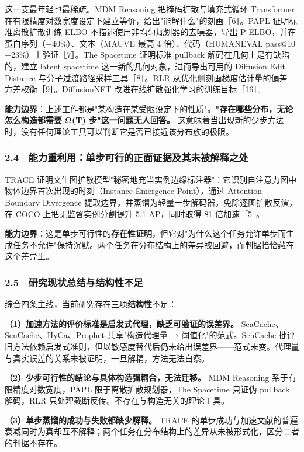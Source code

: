 \documentclass[12pt,a4paper]{ctexart}
\begin{document}
这一支最年轻也最稀疏。MDM Reasoning 把掩码扩散与填充式循环 Transformer 在有限精度对数宽度设定下建立等价，给出"能解什么"的刻画［6］。PAPL 证明标准离散扩散训练 ELBO 不描述使用非均匀规划器的去噪器，导出 P-ELBO，并在蛋白序列（+40\%）、文本（MAUVE 最高 4 倍）、代码（HUMANEVAL pass@10 +23\%）上验证［7］。The Spacetime 证明标准 pullback 解码在几何上是有缺陷的，建立 latent spacetime 这一新的几何对象，进而导出可用的 Diffusion Edit Distance 与分子过渡路径采样工具［8］。RLR 从优化侧刻画梯度估计量的偏差—方差权衡［9］。DiffusionNFT 改进在线扩散强化学习的训练目标［16］。

\textbf{能力边界}：上述工作都是"某构造在某受限设定下的性质"。\textbf{"存在哪些分布，无论怎么构造都需要 Ω(T) 步"这一问题无人回答。} 这意味着当出现新的少步方法时，没有任何理论工具可以判断它是否已接近该分布族的极限。

\subsubsection*{2.4　能力重利用：单步可行的正面证据及其未被解释之处}

TRACE 证明文生图扩散模型"秘密地充当实例边缘标注器"：它识别自注意力图中物体边界首次出现的时刻（Instance Emergence Point），通过 Attention Boundary Divergence 提取边界，并蒸馏为轻量一步解码器，免除逐图扩散反演，在 COCO 上把无监督实例分割提升 5.1 AP，同时取得 81 倍加速［5］。

\textbf{能力边界}：这是单步可行性的\textbf{存在性证明}，但它对"为什么这个任务允许单步而生成任务不允许"保持沉默。两个任务在分布结构上的差异被回避，而判据恰恰藏在这个差异里。

\subsubsection*{2.5　研究现状总结与结构性不足}

综合四条主线，当前研究存在三项\textbf{结构性}不足：

\textbf{（1）加速方法的评价标准是启发式代理，缺乏可验证的误差界。} SeaCache、SenCache、HyCa、Prophet 共享"构造代理量 → 阈值化"的范式。SenCache 批评旧方法依赖启发式准则，但以敏感度替代后仍未给出误差界——范式未变。代理量与真实误差的关系未被证明，一旦解耦，方法无法自察。

\textbf{（2）少步可行性的结论与具体构造强耦合，无法迁移。} MDM Reasoning 系于有限精度对数宽度，PAPL 限于离散扩散规划器，The Spacetime 只证伪 pullback 解码，RLR 只处理截断反传。不存在与构造无关的理论工具。

\textbf{（3）单步蒸馏的成功与失败都缺少解释。} TRACE 的单步成功与加速文献的普遍衰减同时为真却互不解释；两个任务在分布结构上的差异从未被形式化，区分二者的判据不存在。
\end{document}
